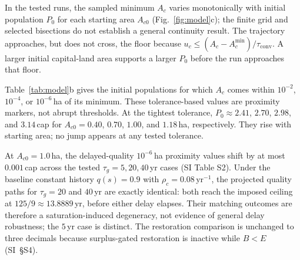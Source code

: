 \documentclass[preprint,12pt,authoryear]{elsarticle}
\newcommand{\Acmin}{A_c^{\min}}
\newcommand{\tconv}{\tau_{\mathrm{conv}}}
\begin{document}
In the tested runs, the sampled minimum $A_c$ varies monotonically with initial population $P_0$ for each starting area $A_{c0}$ (Fig.~\ref{fig:model}c); the finite grid and selected bisections do not establish a general continuity result. The trajectory approaches, but does not cross, the floor because $u_c\le(A_c-\Acmin)/\tconv$. A larger initial capital-land area supports a larger $P_0$ before the run approaches that floor.

Table~\ref{tab:model}b gives the initial populations for which $A_c$ comes within $10^{-2}$, $10^{-4}$, or $10^{-6}$\,ha of its minimum. These tolerance-based values are proximity markers, not abrupt thresholds. At the tightest tolerance, $P_0\approx2.41$, $2.70$, $2.98$, and $3.14$\,cap for $A_{c0}=0.40$, $0.70$, $1.00$, and $1.18$\,ha, respectively. They rise with starting area; no jump appears at any tested tolerance.

At $A_{c0}=1.0$\,ha, the delayed-quality $10^{-6}$\,ha proximity values shift by at most $0.001$\,cap across the tested $\tau_g=5,20,40$\,yr cases (SI Table S2). Under the baseline constant history $q(s)=0.9$ with $\rho_c=0.08$\,yr$^{-1}$, the projected quality paths for $\tau_g=20$ and $40$\,yr are exactly identical: both reach the imposed ceiling at $125/9\approx13.8889$\,yr, before either delay elapses. Their matching outcomes are therefore a saturation-induced degeneracy, not evidence of general delay robustness; the $5$\,yr case is distinct. The restoration comparison is unchanged to three decimals because surplus-gated restoration is inactive while $B<E$ (SI~\S S4).
\end{document}
